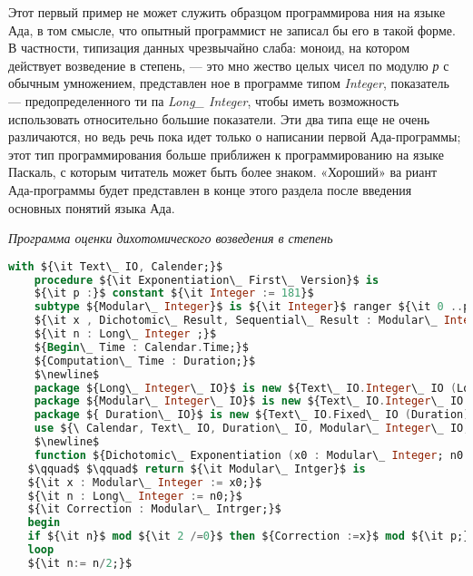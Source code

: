  Этот первый пример не может служить образцом программирова­
ния на языке Ада, в том смысле, что опытный программист не записал
бы его в такой форме. В частности, типизация данных чрезвычайно
слаба: моноид, на котором действует возведение в степень, — это мно­
жество целых чисел по модулю {\it р} с обычным умножением, представлен­
ное в программе типом {\it Integer}, показатель — предопределенного ти­
па {\it Long\_ Integer}, чтобы иметь возможность использовать относительно
большие показатели. Эти два типа еще не очень различаются, но ведь
речь пока идет только о написании первой Ада-программы; этот тип
программирования больше приближен к программированию на языке
Паскаль, с которым читатель может быть более знаком. «Хороший» ва­
риант Ада-программы будет представлен в конце этого раздела после
введения основных понятий языка Ада.
\begin{center}
\parbox{8cm}{
{\it {\small Программа оценки дихотомического возведения в степень}}}
\end{center}
\begin{lstlisting}[mathescape=true, language=Ada, basicstyle=\small]
    with ${\it Text\_ IO, Calender;}$
    procedure ${\it Exponentiation\_ First\_ Version}$ is
    ${\it p :}$ constant ${\it Integer := 181}$
    subtype ${Modular\_ Integer}$ is ${\it Integer}$ ranger ${\it 0 ..p-1}$ 
    ${\it x , Dichotomic\_ Result, Sequential\_ Result : Modular\_ Integer;}$
    ${\it n : Long\_ Integer ;}$
    ${Begin\_ Time : Calendar.Time;}$
    ${Computation\_ Time : Duration;}$
    $\newline$
    package ${Long\_ Integer\_ IO}$ is new ${Text\_ IO.Integer\_ IO (Long\_ Integer);}$
    package ${Modular\_ Integer\_ IO}$ is new ${Text\_ IO.Integer\_ IO (Modular\_ Integer);}$
    package ${ Duration\_ IO}$ is new ${Text\_ IO.Fixed\_ IO (Duration);}$
    use ${\ Calendar, Text\_ IO, Duration\_ IO, Modular\_ Integer\_ IO, Long\_ Integer\_ IO;}$
    $\newline$
    function ${Dichotomic\_ Exponentiation (x0 : Modular\_ Integer; n0 : Long\_ Integer)}$
   $\qquad$ $\qquad$ return ${\it Modular\_ Intger}$ is
   ${\it x : Modular\_ Integer := x0;}$
   ${\it n : Long\_ Integer := n0;}$
   ${\it Correction : Modular\_ Intrger;}$
   begin
   if ${\it n}$ mod ${\it 2 /=0}$ then ${Correction :=x}$ mod ${\it p;}$ else ${\it Correction := 1;}$ end if;
   loop
   ${\it n:= n/2;}$
 
   \end{lstlisting} 

